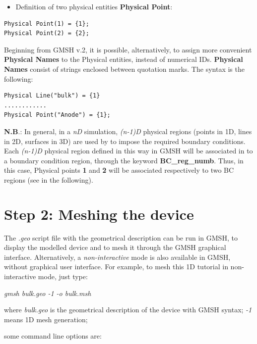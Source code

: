 \begin{itemize}
\item Definition of two physical entities\textbf{ Physical Point}:  
\end{itemize}

\begin{verbatim}
Physical Point(1) = {1};
Physical Point(2) = {2}; 
\end{verbatim}

Beginning  from  GMSH v.2, it  is  possible, alternatively,   to  assign  more  convenient \textbf{Physical Names}  to  the  Physical entities, instead of  numerical IDs.  \textbf{Physical Names} consist of  strings  enclosed between  quotation marks.
The  syntax is the  following:

\begin{verbatim}
Physical Line("bulk") = {1}
............
Physical Point("Anode") = {1};
\end{verbatim}



    \textbf{N.B}.: In general, in a \textit{nD} simulation, \textit{(n-1)D }physical regions (points in 1D, lines in 2D, surfaces in 3D) are used by \TiberCAD{} to impose the required boundary conditions.
      Each  \textit{(n-1)D } physical region defined in this way in GMSH will be associated in \TiberCAD{} to a boundary condition region, through the keyword \textbf{BC\_reg\_numb}. Thus, in this case, Physical points \textbf{1} and \textbf{2} will be associated respectively to two BC regions (see in the following).






\section*{Step 2: Meshing the device}

The \textit{.geo} script file with the geometrical description can be run in GMSH, to display the modelled device and to mesh it through the GMSH graphical interface.
Alternatively, a \textit{non-interactive} mode is also available in GMSH, without graphical user interface. For example, to mesh this 1D tutorial in non-interactive mode, just type:

\textit{gmsh bulk.geo  -1 -o bulk.msh }

where \textit{bulk.geo}  is the geometrical description of the device with GMSH syntax;
\textit{-1} means 1D mesh generation;

some command line options are:

